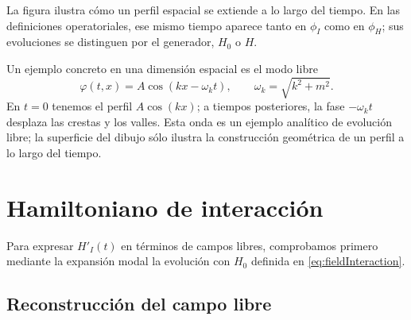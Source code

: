 \documentclass[11pt,letterpaper]{article}
\theoremstyle{definition}
\theoremstyle{definition}
\begin{document}
La figura ilustra cómo un perfil espacial se extiende a lo largo del tiempo.
En las definiciones operatoriales, ese mismo tiempo aparece tanto en $\phi_I$
como en $\phi_H$; sus evoluciones se distinguen por el generador, $H_0$ o $H$.

Un ejemplo concreto en una dimensión espacial es el modo libre
\[
 \varphi(t,x)=A\cos(kx-\omega_k t),\qquad
 \omega_k=\sqrt{k^2+m^2}.
\]
En $t=0$ tenemos el perfil $A\cos(kx)$; a tiempos posteriores,
la fase $-\omega_k t$ desplaza las crestas y los valles. Esta onda es
un ejemplo analítico de evolución libre; la superficie del dibujo
sólo ilustra la construcción geométrica de un perfil a lo largo del tiempo.

\section{Hamiltoniano de interacción}

Para expresar $H'_I(t)$ en términos de campos libres, comprobamos primero
mediante la expansión modal la evolución con $H_0$ definida en
\eqref{eq:fieldInteraction}.

\subsection{Reconstrucción del campo libre}
\end{document}

